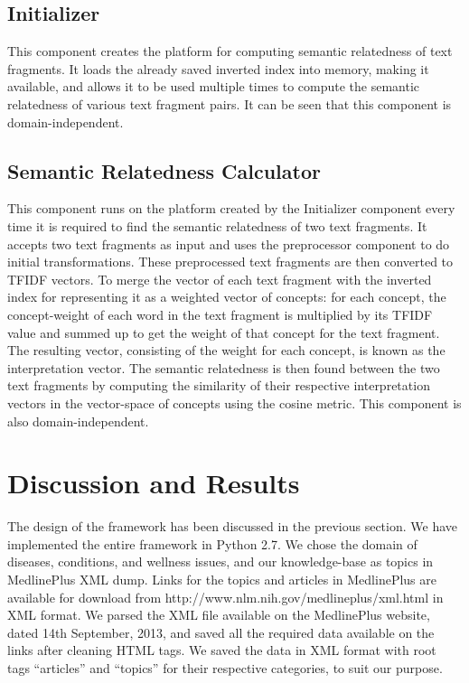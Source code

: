 \documentclass[conference]{IEEEtran}
\begin{document}
\subsection{Initializer}

This component creates the platform for computing semantic relatedness of text fragments. It loads the already saved inverted index into memory, making it available, and allows it to be used multiple times to compute the semantic relatedness of various text fragment pairs. It can be seen that this component is domain-independent.

\subsection{Semantic Relatedness Calculator}

This component runs on the platform created by the Initializer component every time it is required to find the semantic relatedness of two text fragments. It accepts two text fragments as input and uses the preprocessor component to do initial transformations. These preprocessed text fragments are then converted to TFIDF vectors. To merge the vector of each text fragment with the inverted index for representing it as a weighted vector of concepts: for each concept, the concept-weight of each word in the text fragment is multiplied by its TFIDF value and summed up to get the weight of that concept for the text fragment. The resulting vector, consisting of the weight for each concept, is known as the interpretation vector. The semantic relatedness is then found between the two text fragments by computing the similarity of their respective interpretation vectors in the vector-space of concepts using the cosine metric. This component is also domain-independent.


\section{Discussion and Results}

The design of the framework has been discussed in the previous section. We have implemented the entire framework in Python 2.7. We chose the domain of diseases, conditions, and wellness issues, and our knowledge-base as topics in MedlinePlus XML dump. Links for the topics and articles in MedlinePlus are available for download from http://www.nlm.nih.gov/medlineplus/xml.html in XML format. We parsed the XML file available on the MedlinePlus website, dated 14th September, 2013, and saved all the required data available on the links after cleaning HTML tags. We saved the data in XML format with root tags ``articles'' and ``topics'' for their respective categories, to suit our purpose.
\end{document}
